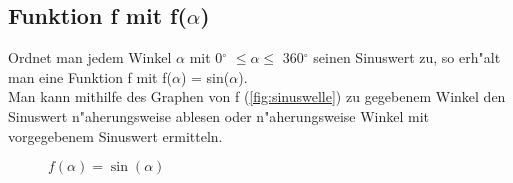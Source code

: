 \documentclass{standalone}
\begin{document}
\subsection{Funktion f mit f($\alpha$)}

Ordnet man jedem Winkel $\alpha$ mit 0$^\circ$  $\leq \alpha \leq$ 360$^\circ$  seinen Sinuswert zu, so erh{"a}lt man eine Funktion f mit f($\alpha$) = sin($\alpha$).\\
Man kann mithilfe des Graphen von f (\autoref{fig:sinuswelle}) zu gegebenem Winkel den Sinuswert n{"a}herungsweise ablesen oder n{"a}herungsweise Winkel mit vorgegebenem Sinuswert ermitteln.

\begin{figure}[hb!]
  \center
  \def\svgwidth{500px}
  
  \caption{$f(\alpha) = \sin(\alpha)$}
  \label{fig:sinuswelle}
\end{figure}
\end{document}
